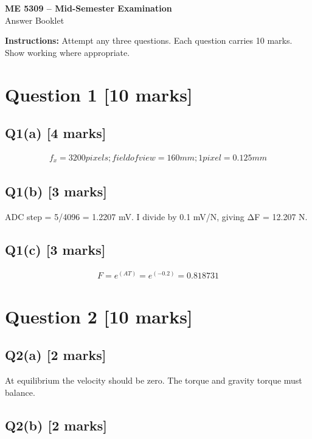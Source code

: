 \documentclass[11pt,a4paper]{article}
\begin{document}
\begin{center}
{\Large\bfseries ME 5309 -- Mid-Semester Examination}\\[3pt]
{\large Answer Booklet}\\[8pt]
\end{center}
\textbf{Instructions:} Attempt any three questions. Each question carries 10 marks. Show working where appropriate.
\section*{Question 1 \hfill [10 marks]}
\subsection*{Q1(a) \hfill [4 marks]}

\[\begin{aligned}f_x = 3200 pixels; field of view = 160 mm; 1 pixel = 0.125 mm\end{aligned}\]

\subsection*{Q1(b) \hfill [3 marks]}

ADC step = 5/4096 = 1.2207 mV.
I divide by 0.1 mV/N, giving ΔF = 12.207 N.

\subsection*{Q1(c) \hfill [3 marks]}

\[\begin{aligned}F = e^(AT) = e^(-0.2) = 0.818731\end{aligned}\]

\section*{Question 2 \hfill [10 marks]}
\subsection*{Q2(a) \hfill [2 marks]}

At equilibrium the velocity should be zero.
The torque and gravity torque must balance.

\subsection*{Q2(b) \hfill [2 marks]}
\end{document}
